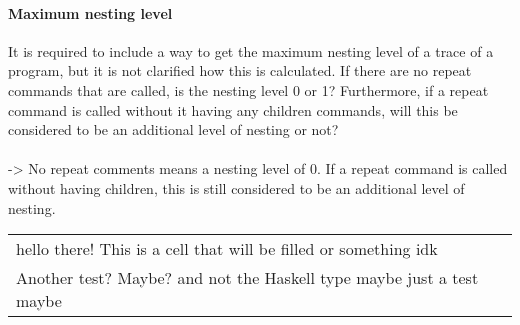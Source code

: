 \paragraph{Maximum nesting level}
It is required to include a way to get the maximum nesting level of a trace of a program, but it is not clarified how this is calculated. If there are no repeat commands that are called, is the nesting level 0 or 1? Furthermore, if a repeat command is called without it having any children commands, will this be considered to be an additional level of nesting or not?\\~\\
-> No repeat comments means a nesting level of 0. If a repeat command is called without having children, this is still considered to be an additional level of nesting. 

\begin{table}[h]
    \centering
    \begin{tabular}{>{\columncolor{lightgreen}}l}
        hello there! This is a cell that will be filled or something idk\\ Another test? Maybe? and not the Haskell type maybe just a test maybe
    \end{tabular}
\end{table}
